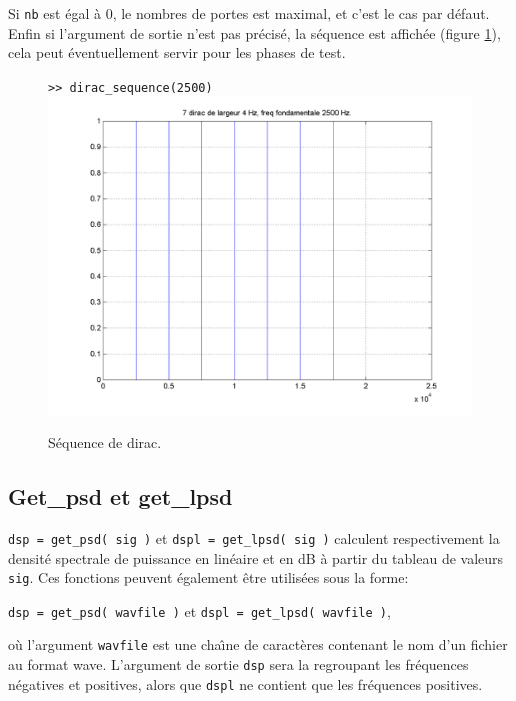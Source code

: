     Si {\tt nb} est {\'e}gal {\`a} 0, le nombres de portes est maximal, et
    c'est le cas par d{\'e}faut. Enfin si l'argument de sortie n'est
    pas pr{\'e}cis{\'e}, la s{\'e}quence est affich{\'e}e (figure \ref{figdirac}),
    cela peut {\'e}ventuellement servir pour les phases de test.\\

    \medskip
    \begin{figure}[h]
      \centering
      {\tt >> dirac\_sequence(2500)}\\
      \includegraphics[width=12cm]{figures/dirac.png}\\
      \caption{S{\'e}quence de dirac.}
      \label{figdirac}
    \end{figure}
    \medskip

    \newpage
    \subsection{Get\_psd et get\_lpsd}
    \label{getpsd}
    {\tt dsp = get\_psd( sig )} et {\tt dspl = get\_lpsd( sig )}
    calculent respectivement la densit{\'e} spectrale de puissance
    en lin{\'e}aire et en dB {\`a} partir du tableau de valeurs {\tt sig}.
    Ces fonctions peuvent {\'e}galement {\^e}tre utilis{\'e}es sous la forme:
    \begin{center}
    {\tt dsp = get\_psd( wavfile )} et {\tt dspl = get\_lpsd( wavfile )},
    \end{center}
    o{\`u} l'argument {\tt wavfile} est une cha{\^\i}ne de caract{\`e}res
    contenant le nom d'un fichier au format wave. L'argument de sortie {\tt dsp} sera
    la \dsp regroupant les fr{\'e}quences n{\'e}gatives et positives, alors
    que {\tt dspl} ne contient que les fr{\'e}quences positives.

